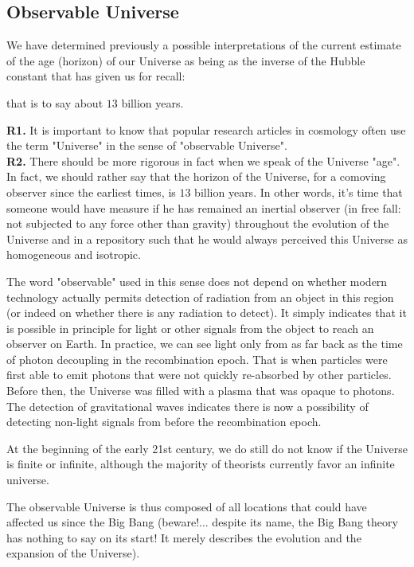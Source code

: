 	\subsection{Observable Universe}
	We have determined previously a possible interpretations of the current estimate of the age (horizon) of our Universe as being as the inverse of the Hubble constant that has given us for recall:
	
	that is to say about $13$ billion years.
	\begin{tcolorbox}[title=Remarks,colframe=black,arc=10pt]
	\textbf{R1.} It is important to know that popular research articles in cosmology  often use the term "Universe" in the sense of "observable Universe".\\
	
	\textbf{R2.} There should be more rigorous in fact when we speak of the Universe "age". In fact, we should rather say that the horizon of the Universe, for a comoving observer since the earliest times, is $13$ billion years. In other words, it's time that someone would have measure if he has remained an inertial observer (in free fall: not subjected to any force other than gravity) throughout the evolution of the Universe and in a repository such that he would always perceived this Universe as homogeneous and isotropic.
	\end{tcolorbox}
	The word "observable" used in this sense does not depend on whether modern technology actually permits detection of radiation from an object in this region (or indeed on whether there is any radiation to detect). It simply indicates that it is possible in principle for light or other signals from the object to reach an observer on Earth. In practice, we can see light only from as far back as the time of photon decoupling in the recombination epoch. That is when particles were first able to emit photons that were not quickly re-absorbed by other particles. Before then, the Universe was filled with a plasma that was opaque to photons. The detection of gravitational waves indicates there is now a possibility of detecting non-light signals from before the recombination epoch.
	
	At the beginning of the early 21st century, we do still do not know if the Universe is finite or infinite, although the majority of theorists currently favor an infinite universe.

	The observable Universe is thus composed of all locations that could have affected us since the Big Bang (beware!... despite its name, the Big Bang theory has nothing to say on its start! It merely describes the evolution and the expansion of the Universe).

